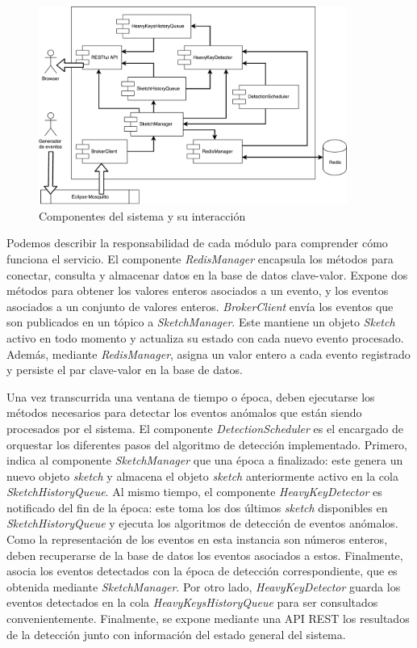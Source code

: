 \documentclass[a4paper,10pt, oneside]{article}
\begin{document}
\begin{figure}[htbp]
	\centering
	\includegraphics[width=0.9\textwidth]{./graph/system_components.pdf}
	\caption{Componentes del sistema y su interacción}
	\label{fig:system_components}
\end{figure}

Podemos describir la responsabilidad de cada módulo para comprender cómo funciona el servicio. El componente \textit{RedisManager} encapsula los métodos para conectar, consulta y almacenar datos en la base de datos clave-valor. Expone dos métodos para obtener los valores enteros asociados a un evento, y los eventos asociados a un conjunto de valores enteros. \textit{BrokerClient} envía los eventos que son publicados en un tópico a \textit{SketchManager}. Este mantiene un objeto \textit{Sketch} activo en todo momento y actualiza su estado con cada nuevo evento procesado. Además, mediante \textit{RedisManager}, asigna un valor entero a cada evento registrado y persiste el par clave-valor en la base de datos.

Una vez transcurrida una ventana de tiempo o época, deben ejecutarse los métodos necesarios para detectar los eventos anómalos que están siendo procesados por el sistema. El componente \textit{DetectionScheduler} es el encargado de orquestar los diferentes pasos del algoritmo de detección implementado. Primero, indica al componente \textit{SketchManager} que una época a finalizado: este genera un nuevo objeto \textit{sketch} y almacena el objeto \textit{sketch} anteriormente activo en la cola \textit{SketchHistoryQueue}. Al mismo tiempo, el componente \textit{HeavyKeyDetector} es notificado del fin de la época: este toma los dos últimos \textit{sketch} disponibles en \textit{SketchHistoryQueue} y ejecuta los algoritmos de detección de eventos anómalos. Como la representación de los eventos en esta instancia son números enteros, deben recuperarse de la base de datos los eventos asociados a estos. Finalmente, asocia los eventos detectados con la época de detección correspondiente, que es obtenida mediante \textit{SketchManager}.
Por otro lado, \textit{HeavyKeyDetector} guarda los eventos detectados en la cola \textit{HeavyKeysHistoryQueue} para ser consultados convenientemente. Finalmente, se expone mediante una API REST los resultados de la detección junto con información del estado general del sistema.
\end{document}
